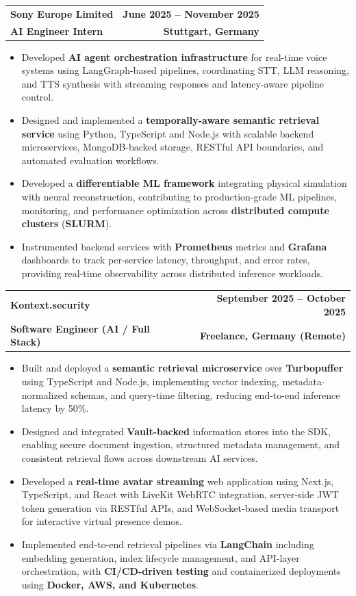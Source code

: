 \documentclass[letterpaper,11pt]{article}
\makeatletter
\newcommand{\resumeItem}[1]{\item\small{\justifying #1}}
\newcommand{\resumeSubheading}[4]{
  \item
  \begin{tabularx}{\textwidth}{@{}X r@{}}
    \textbf{#1} & \textbf{\small #2} \\
    \textbf{\small #3} & \textbf{\small #4} \\
  \end{tabularx}
  \vspace{-3pt}
}
\newcommand{\resumeItemListStart}{\begin{itemize}[leftmargin=0.18in]}
\newcommand{\resumeItemListEnd}{\end{itemize}\vspace{-6pt}}
\makeatother
\begin{document}
  \resumeSubheading
      {Sony Europe Limited}{June 2025 -- November 2025}
      {AI Engineer Intern}{Stuttgart, Germany}
      \vspace{-5pt}
      \resumeItemListStart
\resumeItem{Developed \textbf{AI agent orchestration infrastructure} for real-time voice systems using LangGraph-based pipelines, coordinating STT, LLM reasoning, and TTS synthesis with streaming responses and latency-aware pipeline control.}
\resumeItem{Designed and implemented a \textbf{temporally-aware semantic retrieval service} using Python, TypeScript and Node.js with scalable backend microservices, MongoDB-backed storage, RESTful API boundaries, and automated evaluation workflows.}
\resumeItem{Developed a \textbf{differentiable ML framework} integrating physical simulation with neural reconstruction, contributing to
production-grade ML pipelines, monitoring, and performance optimization across \textbf{distributed compute clusters}
(\textbf{SLURM}).}
\resumeItem{Instrumented backend services with \textbf{Prometheus} metrics and \textbf{Grafana} dashboards to track per-service latency, throughput, and error rates, providing real-time observability across distributed inference workloads.}
      \resumeItemListEnd
      \vspace{7pt}

\resumeSubheading
  {Kontext.security}{September 2025 -- October 2025}
  {Software Engineer (AI / Full Stack)}{Freelance, Germany (Remote)}
  \vspace{-5pt}
  \resumeItemListStart
\resumeItem{Built and deployed a \textbf{semantic retrieval microservice} over \textbf{Turbopuffer} using TypeScript and Node.js, implementing vector indexing, metadata-normalized schemas, and query-time filtering, reducing end-to-end inference latency by 50\%.}
\resumeItem{Designed and integrated \textbf{Vault-backed} information stores into the SDK, enabling secure document ingestion, structured metadata management, and consistent retrieval flows across downstream AI services.}
\resumeItem{Developed a \textbf{real-time avatar streaming} web application using Next.js, TypeScript, and React with LiveKit WebRTC integration, server-side JWT token generation via RESTful APIs, and WebSocket-based media transport for interactive virtual presence demos.}
\resumeItem{Implemented end-to-end retrieval pipelines via \textbf{LangChain} including embedding generation, index lifecycle management, and API-layer orchestration, with \textbf{CI/CD-driven testing} and containerized deployments using \textbf{Docker, AWS, and Kubernetes}.}
  \resumeItemListEnd
\vspace{10pt}
\end{document}
